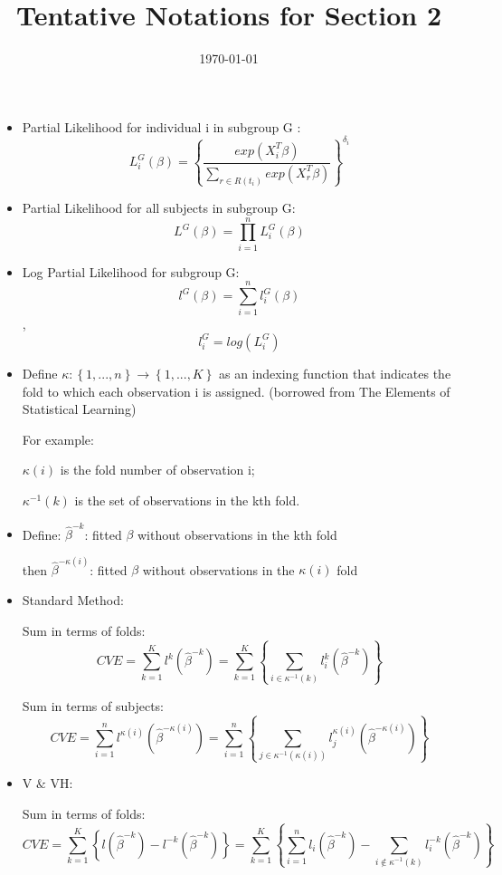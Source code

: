 \documentclass{article}
\title{Tentative Notations for Section 2}
\date{\today}
\begin{document}
\maketitle

\begin{itemize}
\item Partial Likelihood for individual i in subgroup G : $$L_{i}^G(\beta) = \left\{ \frac{exp(X_{i}^{T}\beta)}{\sum_{r\in R(t_{i})}exp(X_{r}^T\beta)}\right\}^{\delta_{i}} $$

\item Partial Likelihood for all subjects in subgroup G: $$ L^{G}(\beta) = \prod_{i = 1}^n L^{G}_{i}(\beta)$$

\item Log Partial Likelihood for subgroup G: $$l^{G}(\beta) = \sum_{i = 1}^n l_{i}^{G}(\beta) $$, $$l_{i}^G = log(L_{i}^G)$$

\item Define $\kappa: \left \{1, ... , n \right \} \rightarrow  \left \{1, ... , K \right \}$ as an indexing function that indicates the fold to which each observation i is assigned. (borrowed from The Elements of Statistical Learning)

\par For example: 
\par $\kappa(i)$ is the fold number of observation i; 
\par $\kappa^{-1}(k)$ is the set of observations in the kth fold.

\item Define: $\hat{\beta}^{-k}$: fitted $\beta$  without observations in the kth fold

\par then $\hat{\beta}^{-\kappa(i)}$: fitted $\beta$  without observations in the $\kappa(i)$ fold

\item Standard Method: 
\par Sum in terms of folds:
$$ CVE = \sum_{k = 1}^K l^{k}(\hat{\beta}^{- k}) = \sum_{k = 1}^K \left\{ \sum_{i \in \kappa^{-1}(k)} l_{i}^{k}(\hat{\beta}^{- k}) \right\}$$

\par Sum in terms of subjects:
$$ CVE = \sum_{i = 1}^n l^{\kappa(i)}(\hat{\beta}^{- \kappa(i)}) = \sum_{i = 1}^n \left\{ \sum_{j \in \kappa^{-1}(\kappa(i))} l_{j}^{\kappa(i)}(\hat{\beta}^{- \kappa(i)}) \right\}$$


\item V $\&$ VH:  
\par Sum in terms of folds:
$$ CVE = \sum_{k = 1}^K \left\{ l(\hat{\beta}^{- k})  - l^{-k}(\hat{\beta}^{- k}) \right\}  =  \sum_{k = 1}^K \left\{ \sum_{i = 1}^n l_{i}(\hat{\beta}^{- k})  - \sum_{i \notin \kappa^{-1}(k)} l_{i}^{-k}(\hat{\beta}^{- k}) \right\} $$


\end{itemize}
\end{document}
